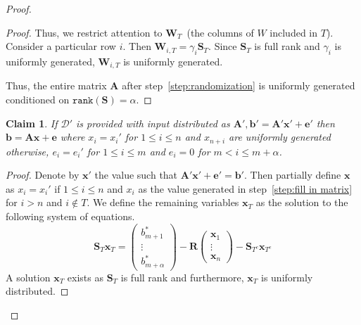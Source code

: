 \documentclass[11pt]{article}
\newcommand{\vect}[1]{\ensuremath{\textbf{#1}}}
\newcommand{\D}{\mathcal{D}}
\newcommand{\rank}{\ensuremath{\mathtt{rank}}\xspace}
\newtheorem{claim}[theorem]{Claim}
\newcommand{\ve}{\vect{e}}
\newcommand{\vS}{\vect{S}}
\newcommand{\vA}{\vect{A}}
\newcommand{\vW}{\vect{W}}
\newcommand{\vR}{\vect{R}}
\newcommand{\vx}{\vect{x}}
\newcommand{\va}{\vect{a}}
\newcommand{\vb}{\vect{b}}
\begin{document}
\begin{proof}
\begin{proof}
Thus, we restrict attention to $\vW_T$~(the columns of $W$ included in $T$).  Consider a particular row $i$.  Then $\vW_{i, T} = \gamma_i \vS_{T}$.  Since $\vS_T$ is full rank and $\gamma_i$ is uniformly generated, $\vW_{i, T}$ is uniformly generated.

Thus, the entire matrix $\vA$ after step~\ref{step:randomization} is uniformly generated conditioned on $\rank(\vS) = \alpha$.
\end{proof}
\begin{claim}
\label{cl:random ax+e}
If $\D'$ is provided with input distributed as $\vA', \vb' = \vA'\vx'+\ve'$ then $\vb = \vA \vx+\ve$ where $x_i = x_i'$ for $1\leq i \leq n$ and $x_{n+i}$ are uniformly generated otherwise,  $e_i = e_i'$ for $1\leq i\leq m$ and $e_i = 0$ for $m<i\leq m+\alpha$.
\end{claim}
\begin{proof}
Denote by $\vx'$ the value such that $\vA'\vx'+\ve' = \vb'$.  
Then partially define $\vx$ as $x_i = x_i'$ if $1\leq i \leq n$ and $x_i$ as the value generated in step~\ref{step:fill in matrix} for $i>n $ and $i\not\in T$.  We define the remaining variables $\vx_T$ as the solution to the following system of equations.
\[
\vS_T  \vx_T = \begin{pmatrix} b_{m+1}^*  \\ \vdots \\b_{m+\alpha}^* \end{pmatrix}  - \vR \begin{pmatrix} \vx_1  \\ \vdots \\\vx_n \end{pmatrix}- \vS_{T^c} \vx_{T^c}  
\]
A solution $\vx_T$ exists as $\vS_T$ is full rank and furthermore, $\vx_T$ is uniformly distributed.

\end{proof}
\end{proof}
\end{document}
